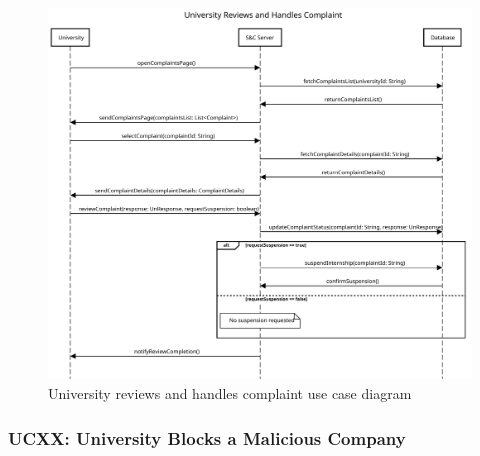 \begin{figure}[H]
    \centering
    \includegraphics[width=1.0\textwidth]{Images/UC_16.pdf}
    \caption{University reviews and handles complaint use case diagram}
    \label{fig:use-case-diagram-16}
\end{figure}


\subsubsection{UCXX: University Blocks a Malicious Company}
\label{subsubsec:university-blocks-a-malicious-company}


